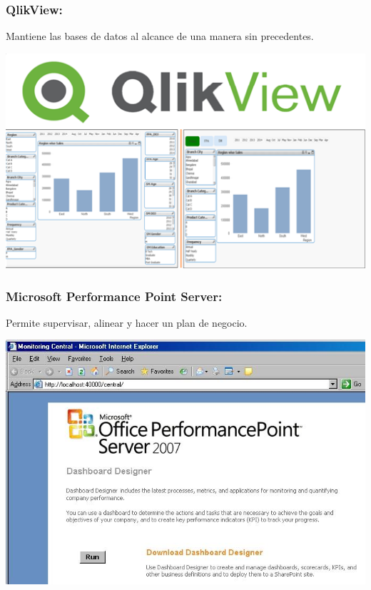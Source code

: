 \newpage	
\subsubsection{QlikView: }\label{sec:nada2}  
Mantiene las bases de datos al alcance de una manera sin precedentes.
	\begin{center}
	\includegraphics[width=15cm]{./Imagenes/BIimagen6}
	\end{center}
	
\subsubsection{Microsoft Performance Point Server: }\label{sec:nada2}  
Permite supervisar, alinear y hacer un plan de negocio.
	\begin{center}
	\includegraphics[width=15cm]{./Imagenes/BIimagen7}
	\end{center}
	
